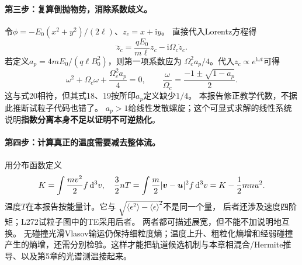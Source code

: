 \paragraph{第三步：复算倒抛物势，消除系数歧义。}
令$\phi=-E_0(x^2+y^2)/(2\ell)$、$z_c=x+\mathrm i y$。
直接代入Lorentz方程得
\begin{equation}
\ddot z_c=\frac{qE_0}{m\ell}z_c-\mathrm i\Omega_c\dot z_c.
\end{equation}
若定义$a_p=4mE_0/(q\ell B_0^2)$，则第一项系数应为
$\Omega_c^2a_p/4$。代入$z_c\propto e^{\mathrm i\omega t}$可得
\begin{equation}
\omega^2+\Omega_c\omega+\frac{\Omega_c^2a_p}{4}=0,\qquad
\frac{\omega}{\Omega_c}=\frac{-1\pm\sqrt{1-a_p}}{2}.
\end{equation}
这与\citet{L272}式20相符，但其式18、19按所印$a_p$定义缺少$1/4$。
本报告修正教学代数，不据此推断试粒子代码也错了。
$a_p>1$给线性发散螺旋；这个可显式求解的线性系统说明\textbf{指数分离本身不足以证明不可逆热化}。

\paragraph{第四步：计算真正的温度需要减去整体流。}
用分布函数定义
\begin{equation}
K=\int \frac{mv^2}{2}f\,\mathrm d^3v,\quad
\frac32 nT=\int\frac m2|\bm{v}-\bm{u}|^2f\,\mathrm d^3v
=K-\frac12mn u^2 .
\end{equation}
温度$T$在本报告按能量计。它与
$\sqrt{\langle\epsilon^2\rangle-\langle\epsilon\rangle^2}$不是同一个量，
后者还涉及速度四阶矩；L272试粒子图中的TE采用后者。
两者都可描述展宽，但不能不加说明地互换。
无碰撞光滑Vlasov输运仍保持细粒度熵；温度上升、粗粒化熵增和经弱碰撞产生的熵增，还需分别检验。这样才能把轨道候选机制与本章相混合/Hermite推导、以及第5章的光谱测温接起来。
